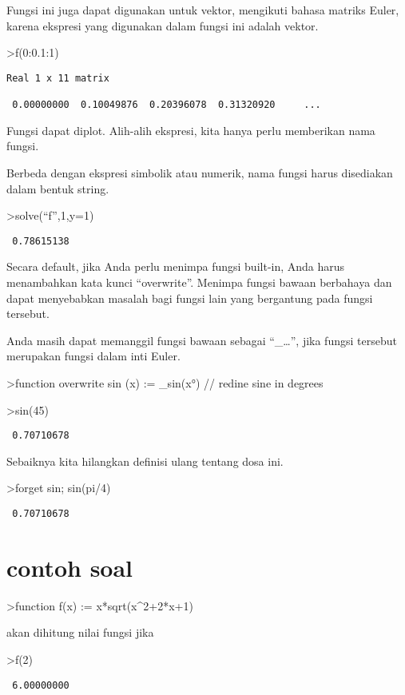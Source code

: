 \documentclass[
]{book}
\begin{document}
Fungsi ini juga dapat digunakan untuk vektor, mengikuti bahasa matriks Euler, karena ekspresi yang digunakan dalam fungsi ini adalah vektor.

\textgreater f(0:0.1:1)

\begin{verbatim}
Real 1 x 11 matrix

 0.00000000  0.10049876  0.20396078  0.31320920     ...
\end{verbatim}

Fungsi dapat diplot. Alih-alih ekspresi, kita hanya perlu memberikan nama fungsi.

Berbeda dengan ekspresi simbolik atau numerik, nama fungsi harus disediakan dalam bentuk string.

\textgreater solve(``f'',1,y=1)

\begin{verbatim}
 0.78615138 
\end{verbatim}

Secara default, jika Anda perlu menimpa fungsi built-in, Anda harus menambahkan kata kunci ``overwrite''. Menimpa fungsi bawaan berbahaya dan dapat menyebabkan masalah bagi fungsi lain yang bergantung pada fungsi tersebut.

Anda masih dapat memanggil fungsi bawaan sebagai ``\_\ldots'', jika fungsi tersebut merupakan fungsi dalam inti Euler.

\textgreater function overwrite sin (x) := \_sin(x°) // redine sine in degrees

\textgreater sin(45)

\begin{verbatim}
 0.70710678 
\end{verbatim}

Sebaiknya kita hilangkan definisi ulang tentang dosa ini.

\textgreater forget sin; sin(pi/4)

\begin{verbatim}
 0.70710678 
\end{verbatim}

\section{contoh soal}\label{contoh-soal-6}

\textgreater function f(x) := x*sqrt(x\^{}2+2*x+1)

akan dihitung nilai fungsi jika

\textgreater f(2)

\begin{verbatim}
 6.00000000 
\end{verbatim}
\end{document}
